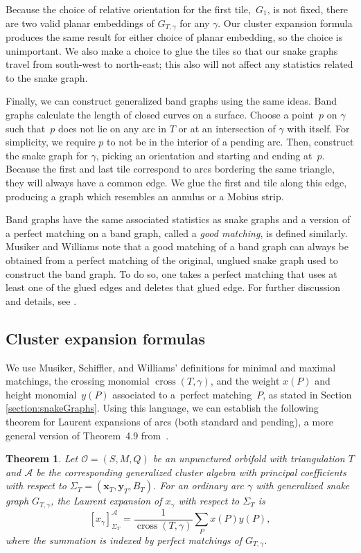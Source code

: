 \documentclass[11pt]{article}
\numberwithin{equation}{section}
\newtheorem{Theorem}{Theorem}[section]
\begin{document}
Because the choice of relative orientation for the first tile,~$G_1$, is not fixed, there are two valid planar embeddings of $G_{T,\gamma}$ for any $\gamma$. Our cluster expansion formula produces the same result for either choice of planar embedding, so the choice is unimportant. We also make a choice to glue the tiles so that our snake graphs travel from south-west to north-east; this also will not affect any statistics related to the snake graph.

Finally, we can construct generalized band graphs using the same ideas. Band graphs calculate the length of closed curves on a surface. Choose a point~$p$ on $\gamma$ such that~$p$ does not lie on any arc in $T$ or at an intersection of $\gamma$ with itself. For simplicity, we require $p$ to not be in the interior of a pending arc. Then, construct the snake graph for $\gamma$, picking an orientation and starting and ending at~$p$. Because the first and last tile correspond to arcs bordering the same triangle, they will always have a common edge. We glue the first and tile along this edge, producing a graph which resembles an annulus or a Mobius strip.

Band graphs have the same associated statistics as snake graphs and a version of a perfect matching on a band graph, called a \emph{good matching}, is defined similarly. Musiker and Williams note that a good matching of a band graph can always be obtained from a perfect matching of the original, unglued snake graph used to construct the band graph. To do so, one takes a perfect matching that uses at least one of the glued edges and deletes that glued edge. For further discussion and details, see \cite[Section~3]{MW}.

\subsection{Cluster expansion formulas}

We use Musiker, Schiffler, and Williams' definitions for minimal and maximal matchings, the crossing monomial $\operatorname{cross}(T,\gamma)$, and the weight $x(P)$ and height monomial~$y(P)$ associated to a~perfect matching~$P$, as stated in Section \ref{section:snakeGraphs}. Using this language, we can establish the following theorem for Laurent expansions of arcs (both standard and pending), a more general version of Theorem~4.9 from~\cite{MSW}.

\begin{Theorem}\label{Thm:GenSnake+}
Let $\mathcal{O} = (S,M,Q)$ be an unpunctured orbifold with triangulation $T$ and $\mathcal{A}$ be the corresponding generalized cluster algebra with principal coefficients with respect to $\Sigma_T = (\mathbf{x}_T,\mathbf{y}_T,B_T)$. For an ordinary arc $\gamma$ with generalized snake graph $G_{T,\gamma}$, the Laurent expansion of $x_\gamma$ with respect to $\Sigma_T$ is
\[ [x_\gamma]^{\mathcal{A}}_{\Sigma_T} = \frac{1}{\operatorname{cross}(T,\gamma)} \sum_P x(P)y(P), \]
where the summation is indexed by perfect matchings of $G_{T,\gamma}$.
\end{Theorem}
\end{document}
